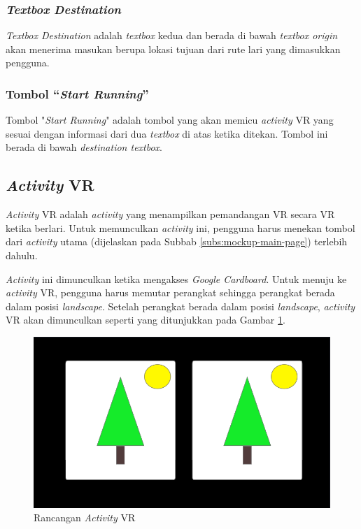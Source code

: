 \subsubsection{\textit{Textbox Destination}}
\textit{Textbox Destination} adalah \textit{textbox} kedua dan berada di bawah \textit{textbox origin}  akan menerima masukan berupa lokasi tujuan dari rute lari yang dimasukkan pengguna.   

\subsubsection{Tombol ``\textit{Start Running}''}
Tombol "\textit{Start Running}" adalah tombol yang akan memicu \textit{activity} VR yang sesuai dengan informasi dari dua \textit{textbox} di atas ketika ditekan. Tombol ini berada di bawah \textit{destination textbox}.

\subsection{\textit{Activity} VR}
\textit{Activity} VR adalah \textit{activity} yang menampilkan pemandangan VR secara VR ketika berlari. Untuk memunculkan \textit{activity} ini, pengguna harus menekan tombol dari \textit{activity} utama (dijelaskan pada Subbab \ref{subs:mockup-main-page}) terlebih dahulu.

\textit{Activity} ini dimunculkan ketika mengakses \textit{Google Cardboard}. Untuk menuju ke \textit{activity} VR, pengguna harus memutar perangkat sehingga perangkat berada dalam posisi \textit{landscape}. Setelah perangkat berada dalam posisi \textit{landscape}, \textit{activity} VR akan dimunculkan seperti yang ditunjukkan pada Gambar \ref{fig:mockup-vr-page}.

\begin{figure}[h]
	\centering
		\includegraphics[scale=0.7]{Gambar/mockup-vr-page.png}
	\caption{Rancangan \textit{Activity} VR}
	\label{fig:mockup-vr-page}
\end{figure}

